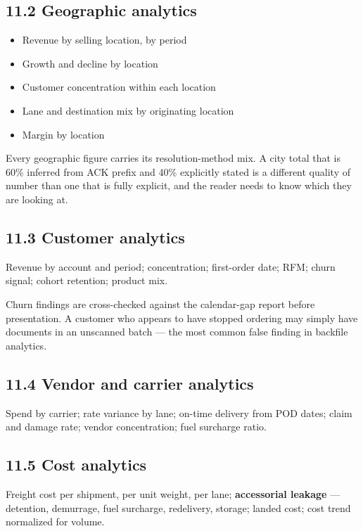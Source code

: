 \documentclass[
]{article}
\providecommand{\tightlist}{%
  \setlength{\itemsep}{0pt}\setlength{\parskip}{0pt}}
\begin{document}
\subsection{11.2 Geographic analytics}\label{geographic-analytics}

\begin{itemize}
\tightlist
\item
  Revenue by selling location, by period
\item
  Growth and decline by location
\item
  Customer concentration within each location
\item
  Lane and destination mix by originating location
\item
  Margin by location
\end{itemize}

Every geographic figure carries its resolution-method mix. A city total
that is 60\% inferred from ACK prefix and 40\% explicitly stated is a
different quality of number than one that is fully explicit, and the
reader needs to know which they are looking at.

\subsection{11.3 Customer analytics}\label{customer-analytics}

Revenue by account and period; concentration; first-order date; RFM;
churn signal; cohort retention; product mix.

Churn findings are cross-checked against the calendar-gap report before
presentation. A customer who appears to have stopped ordering may simply
have documents in an unscanned batch --- the most common false finding
in backfile analytics.

\subsection{11.4 Vendor and carrier
analytics}\label{vendor-and-carrier-analytics}

Spend by carrier; rate variance by lane; on-time delivery from POD
dates; claim and damage rate; vendor concentration; fuel surcharge
ratio.

\subsection{11.5 Cost analytics}\label{cost-analytics}

Freight cost per shipment, per unit weight, per lane;
\textbf{accessorial leakage} --- detention, demurrage, fuel surcharge,
redelivery, storage; landed cost; cost trend normalized for volume.
\end{document}
